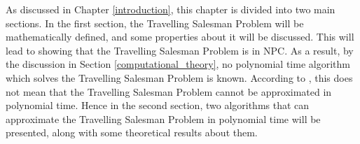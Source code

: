 \documentclass[12pt]{article}
\numberwithin{equation}{subsection}
\numberwithin{table}{subsection}
\numberwithin{algorithm}{subsection}
\begin{document}
\newpage
{}
As discussed in Chapter \ref{introduction}, this chapter is divided into two main sections. In the first section, the Travelling Salesman Problem will be mathematically defined, and some properties about it will be discussed. This will lead to showing that the Travelling Salesman Problem is in NPC. As a result, by the discussion in Section \ref{computational_theory}, no polynomial time algorithm which solves the Travelling Salesman Problem is known. According to \cite{cormen_leiserson_rivest_stein}, this does not mean that the Travelling Salesman Problem cannot be approximated in polynomial time. Hence in the second section, two algorithms that can approximate the Travelling Salesman Problem in polynomial time will be presented, along with some theoretical results about them.
\end{document}
